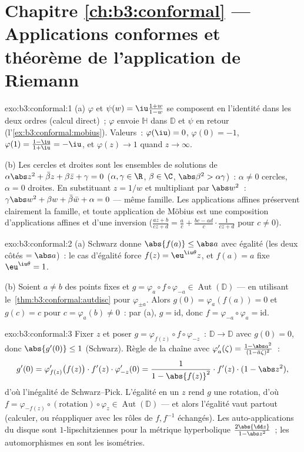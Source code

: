 \section*{Chapitre \ref{ch:b3:conformal} --- Applications
conformes et théorème de l'application de Riemann}

\begin{solution}{exo:b3:conformal:1}
(a) $\varphi$ et $\psi(w) = \iu\frac{1+w}{1-w}$ se composent
en l'identité dans les deux ordres (calcul direct)~;
$\varphi$ envoie $\mathbb H$ dans $\mathbb D$ et $\psi$ en
retour (l'\cref{ex:b3:conformal:mobius}). Valeurs~:
$\varphi(\iu) = 0$, $\varphi(0) = -1$, $\varphi(1) =
\frac{1 - \iu}{1 + \iu} = -\iu$, et $\varphi(z) \to 1$ quand
$z \to \infty$.

(b) Les cercles et droites sont les ensembles de solutions de
$\alpha\abs z^2 + \bar\beta z + \beta\bar z + \gamma = 0$
($\alpha, \gamma \in \R$, $\beta \in \C$, $\abs\beta^2 >
\alpha\gamma$)~: $\alpha \neq 0$ cercles, $\alpha = 0$
droites. En substituant $z = 1/w$ et multipliant par $\abs
w^2$~: $\gamma\abs w^2 + \beta w + \bar\beta\bar w +
\alpha = 0$ --- même famille. Les applications affines
préservent clairement la famille, et toute application de
Möbius est une composition d'applications affines et d'une
inversion ($\frac{az+b}{cz+d} = \frac ac + \frac{bc -
ad}{c}\cdot\frac1{cz + d}$ pour $c \neq 0$).
\end{solution}

\begin{solution}{exo:b3:conformal:2}
(a) Schwarz donne $\abs{f(a)} \leq \abs a$ avec égalité (les
deux côtés $= \abs a$)~: le cas d'égalité force $f(z) =
\eu^{\iu\theta}z$, et $f(a) = a$ fixe $\eu^{\iu\theta} = 1$.

(b) Soient $a \neq b$ des points fixes et $g =
\varphi_a\circ f\circ\varphi_{-a} \in
\operatorname{Aut}(\mathbb D)$ --- en utilisant
le~\cref{thm:b3:conformal:autdisc} pour $\varphi_{\pm a}$.
Alors $g(0) = \varphi_a(f(a)) = 0$ et $g(c) = c$ pour $c =
\varphi_a(b) \neq 0$~: par (a), $g = \mathrm{id}$, donc $f =
\varphi_{-a}\circ\varphi_a = \mathrm{id}$.
\end{solution}

\begin{solution}{exo:b3:conformal:3}
Fixer $z$ et poser $g = \varphi_{f(z)}\circ
f\circ\varphi_{-z}$~:  $\mathbb D \to \mathbb D$
avec $g(0) = 0$, donc $\abs{g'(0)} \leq 1$ (Schwarz). Règle
de la chaîne avec $\varphi_a'(\zeta) = \frac{1 - \abs
a^2}{(1 - \bar a\zeta)^2}$~:
\[
g'(0) = \varphi_{f(z)}'\bigl(f(z)\bigr)\cdot f'(z)\cdot
\varphi_{-z}'(0)
= \frac{1}{1 - \abs{f(z)}^2}\cdot f'(z)\cdot(1 - \abs z^2),
\]
d'où l'inégalité de Schwarz--Pick. L'égalité en un $z$ rend
$g$ une rotation, d'où $f =
\varphi_{-f(z)}\circ(\text{rotation})\circ\varphi_z \in
\operatorname{Aut}(\mathbb D)$ --- et alors l'égalité vaut
partout (calculer, ou réappliquer avec les rôles de $f,
f^{-1}$ échangés). Les auto-applications  du
disque sont $1$-lipschitziennes pour la métrique
hyperbolique $\frac{2\abs{\dd z}}{1 - \abs z^2}$~; les
automorphismes en sont les isométries.
\end{solution}

